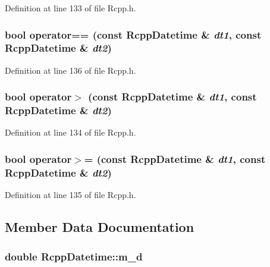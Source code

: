 Definition at line 133 of file Rcpp.h.\hypertarget{classRcppDatetime_c6643666732e0a62c501da9f0ae9e342}{
\subsubsection[{operator==}]{\setlength{\rightskip}{0pt plus 5cm}bool operator== (const {\bf RcppDatetime} \& {\em dt1}, \/  const {\bf RcppDatetime} \& {\em dt2})}}
\label{classRcppDatetime_c6643666732e0a62c501da9f0ae9e342}




Definition at line 136 of file Rcpp.h.\hypertarget{classRcppDatetime_062107b2e2809a60c67f80da5dab77ed}{
\subsubsection[{operator$>$}]{\setlength{\rightskip}{0pt plus 5cm}bool operator$>$ (const {\bf RcppDatetime} \& {\em dt1}, \/  const {\bf RcppDatetime} \& {\em dt2})}}
\label{classRcppDatetime_062107b2e2809a60c67f80da5dab77ed}




Definition at line 134 of file Rcpp.h.\hypertarget{classRcppDatetime_1aac48969216af0555677a43b3617781}{
\subsubsection[{operator$>$=}]{\setlength{\rightskip}{0pt plus 5cm}bool operator$>$= (const {\bf RcppDatetime} \& {\em dt1}, \/  const {\bf RcppDatetime} \& {\em dt2})}}
\label{classRcppDatetime_1aac48969216af0555677a43b3617781}




Definition at line 135 of file Rcpp.h.

\subsection{Member Data Documentation}
\hypertarget{classRcppDatetime_1af187ff381bfa0f5b57d28b64d7b60c}{
\subsubsection[{m\_\-d}]{\setlength{\rightskip}{0pt plus 5cm}double {\bf RcppDatetime::m\_\-d}}}
\label{classRcppDatetime_1af187ff381bfa0f5b57d28b64d7b60c}




